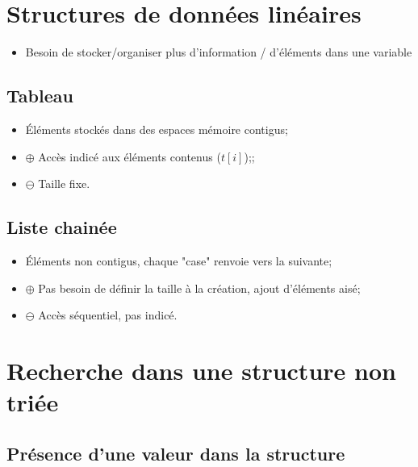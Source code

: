 \documentclass[12pt,a4paper]{article}
\date{}
\begin{document}


\section{Structures de données linéaires}

\begin{itemize}
	\item Besoin de stocker/organiser plus d'information / d'éléments dans une variable
\end{itemize}

\subsection{Tableau}
	\begin{itemize}
		\item Éléments stockés dans des espaces mémoire contigus;
		\item $\oplus$  Accès indicé aux éléments contenus ($t[i]$);;
		\item $\ominus$ Taille fixe.
	\end{itemize}
	

\subsection{Liste chainée}

	\begin{itemize}
		\item \'Eléments non contigus, chaque "case" renvoie vers la suivante;
		\item  $\oplus$ Pas besoin de définir la taille à la création, ajout d'éléments aisé;
		\item $\ominus$ Accès séquentiel, pas indicé.
	\end{itemize}

\section{Recherche dans une structure non triée}

\subsection{Présence d'une valeur dans la structure}
\end{document}
